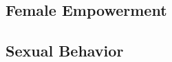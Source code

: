 \documentclass[a4paper,11pt]{article}
\begin{document}
\begin{spacing}{1.5}



\subsection{Female Empowerment}\label{empowerment}
\subsection{Sexual Behavior}\label{sex_behav}

\end{spacing}
\end{document}
